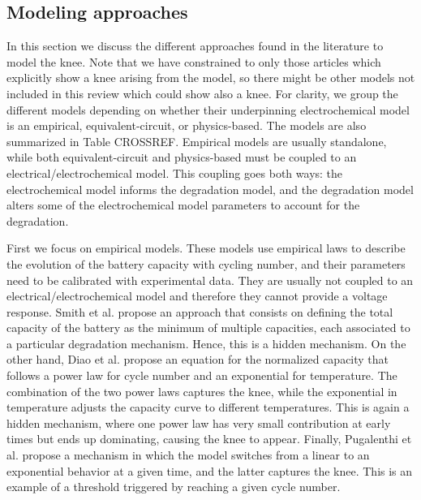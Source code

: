 \documentclass[journal=jpcl, manuscript=article, layout=onecolumn]{achemso}
\begin{document}
\subsection{Modeling approaches}
In this section we discuss the different approaches found in the literature to model the knee. Note that we have constrained to only those articles which explicitly show a knee arising from the model, so there might be other models not included in this review which could show also a knee. For clarity, we group the different models depending on whether their underpinning electrochemical model is an empirical, equivalent-circuit, or physics-based. The models are also summarized in Table {\color{red} CROSSREF}. Empirical models are usually standalone, while both equivalent-circuit and physics-based must be coupled to an electrical/electrochemical model. This coupling goes both ways: the electrochemical model informs the degradation model, and the degradation model alters some of the electrochemical model parameters to account for the degradation. 

First we focus on empirical models. These models use empirical laws to describe the evolution of the battery capacity with cycling number, and their parameters need to be calibrated with experimental data. They are usually not coupled to an electrical/electrochemical model and therefore they cannot provide a voltage response. Smith et al. \cite{smith_models_2014,smith_life_2017} propose an approach that consists on defining the total capacity of the battery as the minimum of multiple capacities, each associated to a particular degradation mechanism. Hence, this is a hidden mechanism. On the other hand, Diao et al. \cite{diao_accelerated_2019} propose an equation for the normalized capacity that follows a power law for cycle number and an exponential for temperature. The combination of the two power laws captures the knee, while the exponential in temperature adjusts the capacity curve to different temperatures. This is again a hidden mechanism, where one power law has very small contribution at early times but ends up dominating, causing the knee to appear. Finally, Pugalenthi et al. \cite{pugalenthi_piecewise_2020} propose a mechanism in which the model switches from a linear to an exponential behavior at a given time, and the latter captures the knee. This is an example of a threshold triggered by reaching a given cycle number.
\end{document}
